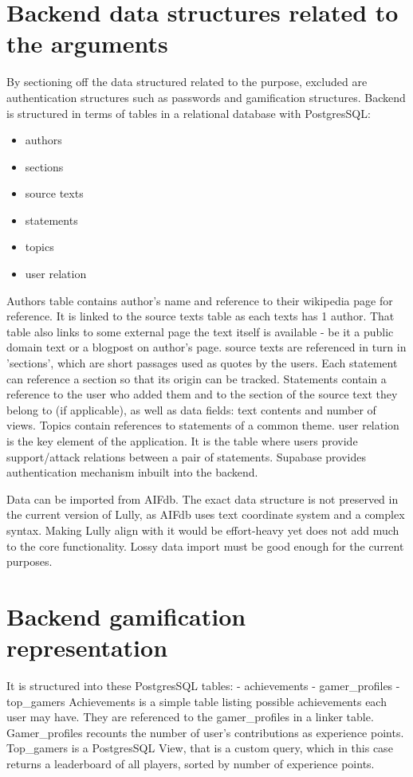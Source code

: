 \documentclass{article}
\begin{document}
\section{Backend data structures related to the arguments}
By sectioning off the data structured related to the purpose, excluded are authentication structures such as passwords and gamification structures.
Backend is structured in terms of tables in a relational database with PostgresSQL:
\begin{itemize}
  \item authors
  \item sections
  \item source texts
  \item statements
  \item topics
  \item user relation
\end{itemize}
Authors table contains author's name and reference to their wikipedia page for reference. It is linked to the source texts table as each texts has 1 author. That table also links to some external page the text itself is available - be it a public domain text or a blogpost on author's page. source texts are referenced in turn in 'sections', which are short passages used as quotes by the users.
Each statement can reference a section so that its origin can be tracked. Statements contain a reference to the user who added them and to the section of the source text they belong to (if applicable), as well as data fields: text contents and number of views. Topics contain references to statements of a common theme.
user relation is the key element of the application. It is the table where users provide support/attack relations between a pair of statements. 
Supabase provides authentication mechanism inbuilt into the backend.

Data can be imported from AIFdb. The exact data structure is not preserved in the current version of Lully, as AIFdb uses text coordinate system and a complex syntax. Making Lully align with it would be effort-heavy yet does not add much to the core functionality. Lossy data import must be good enough for the current purposes.

\section{Backend gamification representation}

It is structured into these PostgresSQL tables:
- achievements
- gamer_profiles 
- top_gamers 
Achievements is a simple table listing possible achievements each user may have. They are referenced to the gamer_profiles in a linker table. Gamer_profiles recounts the number of user's contributions as experience points.
Top_gamers is a PostgresSQL View, that is a custom query, which in this case returns a leaderboard of all players, sorted by number of experience points.
\end{document}
